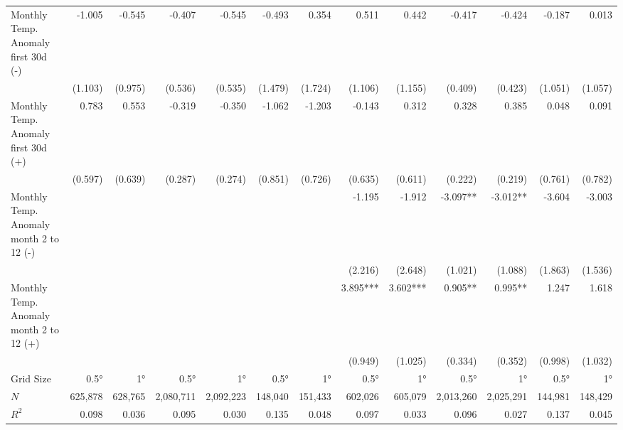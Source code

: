 \begin{table}[H]
\begin{adjustbox}{max width=\linewidth}
\begin{tabular}{lrrrrrrrrrrrr}
    Monthly Temp. Anomaly first 30d   (-)       &      -1.005 &      -0.545 &       -0.407 &      -0.545  &      -0.493 &       0.354  &    0.511 &        0.442  &       -0.417 &       -0.424 &       -0.187 &        0.013\\ 
                                                &     (1.103) &     (0.975) &      (0.536) &     (0.535)  &     (1.479) &     (1.724)  &  (1.106) &      (1.155)  &      (0.409) &      (0.423) &      (1.051) &      (1.057)\\ 
    Monthly Temp. Anomaly first 30d (+)         &       0.783 &       0.553 &       -0.319 &      -0.350  &      -1.062 &      -1.203  &   -0.143 &        0.312  &        0.328 &        0.385 &        0.048 &        0.091\\ 
                                                &     (0.597) &     (0.639) &      (0.287) &     (0.274)  &     (0.851) &     (0.726)  &  (0.635) &      (0.611)  &      (0.222) &      (0.219) &      (0.761) &      (0.782)\\ 
    Monthly Temp. Anomaly month 2 to 12 (-)     &             &             &              &              &             &              &  -1.195  &       -1.912  &     -3.097** &     -3.012** &       -3.604 &       -3.003\\ 
                                                &             &             &              &              &             &              &  (2.216) &      (2.648)  &      (1.021) &      (1.088) &      (1.863) &      (1.536)\\ 
    Monthly Temp. Anomaly month 2 to 12 (+)     &             &             &              &              &             &              & 3.895*** &     3.602***  &      0.905** &      0.995** &        1.247 &        1.618\\ 
                                                &             &             &              &              &             &              &  (0.949) &      (1.025)  &      (0.334) &      (0.352) &      (0.998) &      (1.032)\\ 
    \midrule 
    Grid Size                                   &       0.5°  &      1°     &        0.5°  &       1°     &       0.5°   &      1°     &     0.5°  &       1°     &        0.5°  &      1°      &        0.5°  &      1°     \\ 
    $N$                                         &     625,878 &     628,765 &    2,080,711 &   2,092,223  &      148,040 &     151,433 &   602,026 &      605,079 &    2,013,260 &    2,025,291 &       144,981 &      148,429 \\ 
    $R^2$                                       &       0.098 &       0.036 &        0.095 &       0.030  &        0.135 &       0.048 &     0.097 &        0.033 &        0.096 &        0.027 &         0.137 &        0.045 \\  
    \bottomrule
\end{tabular}
\end{adjustbox}
\end{table}